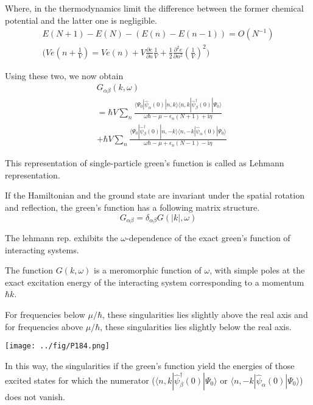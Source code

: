 Where, in the thermodynamics limit the difference between the former chemical potential and the latter one is negligible.
\begin{align}
E(N+1)-E(N)-(E(n)-E(n-1))=O(N^{-1}) \nonumber \\
\bigg ( Ve(n+\frac{1}{V}) = Ve(n)+ V\frac{\partial e}{\partial n}\frac{1}{V} + \frac{1}{2} \frac{\partial^2 e}{\partial n^2} (\frac{1}{V})^2 \bigg) \nonumber
\end{align}

Using these two, we now obtain 
\begin{align}\label{2.3.12}
& G_{\alpha\beta}(k,\omega) \nonumber \\
&=\hbar V\sum_n \frac{\langle\Psi_0|\hat \psi_{\alpha}(0)|n,k\rangle\langle n,k|\hat \psi^{
\dagger}_{\beta} (0)|\Psi_0\rangle}{\omega\hbar-\mu-\epsilon_n(N+1)+\mathrm{i}\eta}  \nonumber \\
&+\hbar V\sum_n \frac{\langle\Psi_0|\hat \psi^{
\dagger}_{\beta} (0)|n,-k\rangle\langle n,-k|\hat \psi_{\alpha}(0)|\Psi_0\rangle}{\omega\hbar-\mu+\epsilon_n(N-1)-\mathrm{i}\eta} 
\end{align}

This representation of single-particle green's function is called as Lehmann representation.

If the Hamiltonian and the ground state are invariant under the spatial rotation and reflection, the green's function has a following matrix structure.
\begin{equation}
G_{\alpha\beta}=\delta_{\alpha\beta}G(|k|,\omega) \nonumber
\end{equation}

The lehmann rep. exhibits the $\omega$-dependence of the exact green's function of interacting systems.

The function $G(k,\omega)$ is a meromorphic function of $\omega$, with simple poles at the exact excitation energy of the interacting system corresponding to a momentum $\hbar k$.

For frequencies below $\mu/\hbar$, these singularities lies slightly above the real axis and for frequencies above $\mu/\hbar$, these singularities  lies slightly below the real axis.

\begin{center}
\texttt{[image: ../fig/P184.png]}
\end{center}
In this way, the singularities if the green's function yield the energies of those excited states for which the numerator ($\langle n,k|\hat \psi^{
\dagger}_{\beta} (0)|\Psi_0\rangle$ or $\langle n,-k|\hat \psi_{\alpha}(0)|\Psi_0\rangle$) does not vanish. 

